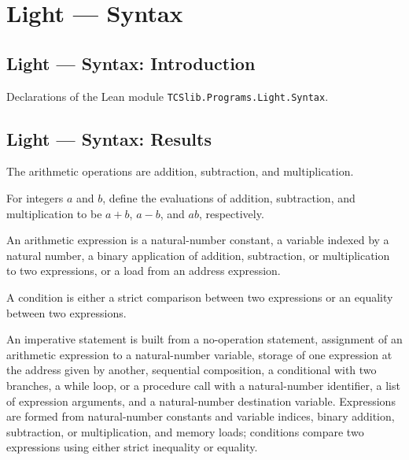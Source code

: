 \section{Light --- Syntax}
\subsection*{Light --- Syntax: Introduction}

Declarations of the Lean module \texttt{TCSlib.Programs.Light.Syntax}.

\subsection*{Light --- Syntax: Results}

\begin{definition}
\label{Light.Op}
\leanok
The arithmetic operations are addition, subtraction, and multiplication.
\end{definition}

\begin{definition}
\label{Light.Op.eval}
\leanok
{}
For integers $a$ and $b$, define the evaluations of addition, subtraction, and
multiplication to be $a+b$, $a-b$, and $ab$, respectively.
\end{definition}

\begin{definition}
\label{Light.Expr}
\leanok
{}
An arithmetic expression is a natural-number constant, a variable indexed by a natural
number, a binary application of addition, subtraction, or multiplication to two
expressions, or a load from an address expression.
\end{definition}

\begin{definition}[Conditions]
\label{Light.Cond}
\leanok
{}
A condition is either a strict comparison between two expressions or an equality between
two expressions.
\end{definition}

\begin{definition}
\label{Light.Stmt}
\leanok
{}
An imperative statement is built from a no-operation statement, assignment of an
arithmetic expression to a natural-number variable, storage of one expression at the
address given by another, sequential composition, a conditional with two branches, a
while loop, or a procedure call with a natural-number identifier, a list of expression
arguments, and a natural-number destination variable. Expressions are formed from
natural-number constants and variable indices, binary addition, subtraction, or
multiplication, and memory loads; conditions compare two expressions using either strict
inequality or equality.
\end{definition}

